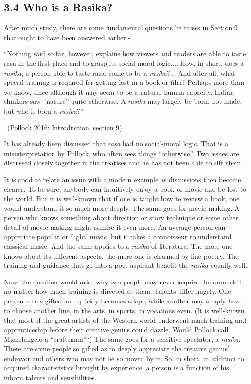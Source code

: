 \subsection*{3.4 Who is a Rasika?}

After much study, there are some fundamental questions he raises in Section 9 that ought to have been answered earlier -

\begin{myquote}
“Nothing said so far, however, explains how viewers and readers are able to taste rasa in the first place and to grasp its social-moral logic.... How, in short, does a \textit{rasika}, a person able to taste rasa, come to be a \textit{rasika}?... And after all, what special training is required for getting lost in a book or film? Perhaps more than we know, since although it may seem to be a natural human capacity, Indian thinkers saw “nature” quite otherwise. A \textit{rasika} may largely be born, not made, but who is born a \textit{rasika}?” 

~\hfill (Pollock 2016: Introduction, section 9)
\end{myquote}

It has already been discussed that \textit{rasa }had no social-moral logic. That is a misinterpretation by Pollock, who often sees things “otherwise”. Two issues are discussed closely together in the treatises and he has not been able to sift them.

It is good to relate an issue with a modern example as discussions then become clearer. To be sure, anybody can intuitively enjoy a book or movie and be lost to the world. But it is well-known that if one is taught how to review a book, one would understand it so much more deeply. The same goes for movie-making. A person who knows something about direction or story technique or some other detail of movie-making might admire it even more. An average person can appreciate popular or ‘light’ music, but it takes a connoisseur to understand classical music. And the same applies to a \textit{rasika }of literature. The more one knows about its different aspects, the more one is charmed by fine poetry. The training and guidance that go into a poet-aspirant benefit the \textit{rasika} equally well.

Now, the question would arise why two people may never acquire the same skill, no matter how much training is directed at them. Talents differ hugely. One person seems gifted and quickly becomes adept; while another may simply have to choose another line, in the arts, in sports, in vocations even. (It is well-known that most of the great artists of the Western world underwent much training and apprenticeship before their creative genius could dazzle. Would Pollock call Michelangelo a “craftsman”?) The same goes for a sensitive spectator, a \textit{rasika}. There are some people so gifted as to deeply appreciate the creative genius’ endeavor and others who may not be so moved by it. So, in short, in addition to acquired characteristics brought by experience, a person is a function of his inborn talents and sensibilities.

